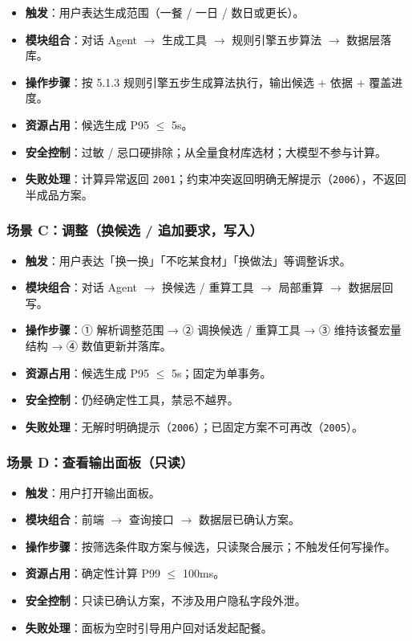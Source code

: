 \documentclass[12pt,a4paper]{ctexart}
\begin{document}
\begin{itemize}
\item \textbf{触发}：用户表达生成范围（一餐 / 一日 / 数日或更长）。
\item \textbf{模块组合}：对话 Agent $\rightarrow$ 生成工具 $\rightarrow$ 规则引擎五步算法 $\rightarrow$ 数据层落库。
\item \textbf{操作步骤}：按 5.1.3 规则引擎五步生成算法执行，输出候选 + 依据 + 覆盖进度。
\item \textbf{资源占用}：候选生成 P95 $\le$ 5s。
\item \textbf{安全控制}：过敏 / 忌口硬排除；从全量食材库选材；大模型不参与计算。
\item \textbf{失败处理}：计算异常返回 \texttt{2001}；约束冲突返回明确无解提示（\texttt{2006}），不返回半成品方案。
\end{itemize}

\subsubsection*{场景 C：调整（换候选 / 追加要求，写入）}

\begin{itemize}
\item \textbf{触发}：用户表达「换一换」「不吃某食材」「换做法」等调整诉求。
\item \textbf{模块组合}：对话 Agent $\rightarrow$ 换候选 / 重算工具 $\rightarrow$ 局部重算 $\rightarrow$ 数据层回写。
\item \textbf{操作步骤}：① 解析调整范围 → ② 调换候选 / 重算工具 → ③ 维持该餐宏量结构 → ④ 数值更新并落库。
\item \textbf{资源占用}：候选生成 P95 $\le$ 5s；固定为单事务。
\item \textbf{安全控制}：仍经确定性工具，禁忌不越界。
\item \textbf{失败处理}：无解时明确提示（\texttt{2006}）；已固定方案不可再改（\texttt{2005}）。
\end{itemize}

\subsubsection*{场景 D：查看输出面板（只读）}

\begin{itemize}
\item \textbf{触发}：用户打开输出面板。
\item \textbf{模块组合}：前端 $\rightarrow$ 查询接口 $\rightarrow$ 数据层已确认方案。
\item \textbf{操作步骤}：按筛选条件取方案与候选，只读聚合展示；不触发任何写操作。
\item \textbf{资源占用}：确定性计算 P99 $\le$ 100ms。
\item \textbf{安全控制}：只读已确认方案，不涉及用户隐私字段外泄。
\item \textbf{失败处理}：面板为空时引导用户回对话发起配餐。
\end{itemize}
\end{document}
